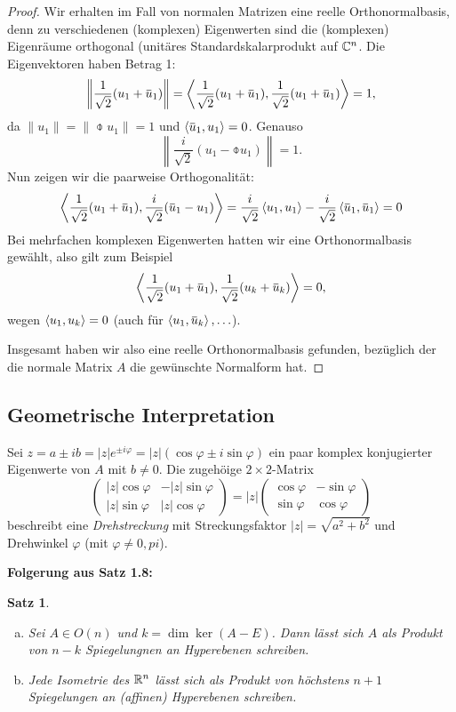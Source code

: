 \documentclass[
 a4paper,
 12pt,
 parskip=half
 ]{scrartcl}
\theoremstyle{plain}
\newtheorem{thm}{Satz}[section] %
\theoremstyle{definition}
\begin{document}
\begin{proof}
 Wir erhalten im Fall von normalen Matrizen eine reelle Orthonormalbasis, denn zu verschiedenen (komplexen) Eigenwerten sind die (komplexen) Eigenräume orthogonal (uni\-täres Standardskalarprodukt auf $\mathbb{C}^n$. Die Eigenvektoren haben Betrag 1:
 \[ \left\| \rez{\sqrt{2}} ( u_1 + \obar{u}_1 ) \right\| = \scalar{\rez{\sqrt{2}} ( u_1 + \obar{u}_1 ), \rez{\sqrt{2}} ( u_1 + \obar{u}_1 )} = 1, \]
 da $\| u_1 \| = \| \obar{u}_1 \| = 1$ und $\scalar{\obar{u}_1, u_1} = 0$. Genauso
 \[ \left\| \frac{i}{\sqrt{2}} ( u_1 - \obar{u}_1 ) \right\| = 1. \]
 Nun zeigen wir die paarweise Orthogonalität:
 \[ \scalar{\rez{\sqrt{2}} (u_1 + \obar{u}_1), \frac{i}{\sqrt{2}} (\obar{u}_1 - u_1)} = \frac{i}{\sqrt{2}} \scalar{u_1, u_1} - \frac{i}{\sqrt{2}} \scalar{\obar{u}_1, \obar{u}_1} = 0 \]
 Bei mehrfachen komplexen Eigenwerten hatten wir eine Orthonormalbasis gewählt, also gilt zum Beispiel
 \[ \scalar{\rez{\sqrt{2}} ( u_1 + \obar{u}_1 ), \rez{\sqrt{2}} ( u_k + \obar{u}_k )} = 0, \]
 wegen $\left\langle u_1, u_k \right\rangle = 0$ (auch für $\scalar{u_1, \obar{u}_k}, \ldots$).
 
 Insgesamt haben wir also eine reelle Orthonormalbasis gefunden, bezüglich der die normale Matrix $A$ die gewünschte Normalform hat.
\end{proof}

\subsection*{Geometrische Interpretation}
Sei $z = a \pm ib = |z| e^{\pm i \varphi} = |z| ( \cos \varphi \pm i \sin \varphi)$ ein paar komplex konjugierter Eigenwerte von $A$ mit $b \ne 0$. Die zugehöige $2 \times 2$-Matrix
\[ \begin{pmatrix} |z| \cos \varphi & - |z| \sin \varphi \\ |z| \sin \varphi & |z| \cos \varphi \end{pmatrix}
   = |z| \begin{pmatrix} \cos \varphi & - \sin \varphi \\ \sin \varphi & \cos \varphi \end{pmatrix} \]
beschreibt eine \emph{Drehstreckung} mit Streckungsfaktor $|z| = \sqrt{a^2 + b^2}$ und Drehwinkel $\varphi$ (mit $\varphi \ne 0, pi$).

\textbf{Folgerung aus Satz 1.8:}
\begin{thm}
 \begin{enumerate}[a)]
  \item Sei $A \in O(n)$ und $k = \dim \ker(A-E)$. Dann lässt sich $A$ als Produkt von $n-k$ Spiegelungnen an Hyperebenen schreiben.
  \item Jede Isometrie des $\mathbb{R}^n$ lässt sich als Produkt von höchstens $n+1$ Spiegelungen an (affinen) Hyperebenen schreiben.
 \end{enumerate}
\end{thm}
\end{document}
